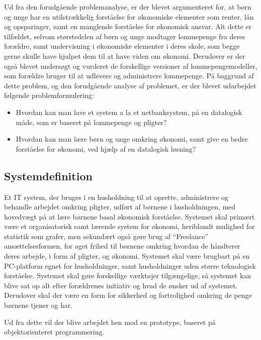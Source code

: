 Ud fra den forudgående problemanalyse, er der blevet argumenteret for, at børn og unge har en utilstrækkelig forståelse for økonomiske elementer som renter, lån og opsparinger, samt en manglende forståelse for økonomisk ansvar. Alt dette er tilfældet, selvom størstedelen af børn og unge modtager lommepenge fra deres forældre, samt undervisning i økonomiske elementer i deres skole, som begge gerne skulle have hjulpet dem til at have viden om økonomi. Derudover er der også blevet undersøgt og vurderet de forskellige versioner af lommepengemodeller, som forældre bruger til at udlevere og administrere lommepenge. På baggrund af dette problem, og den forudgående analyse af problemet, er der blevet udarbejdet følgende problemformulering:

\begin{itemize}

	\item Hvordan kan man lave et system a la et netbanksystem, på en datalogisk måde, som er baseret på lommepenge og pligter?
	\item Hvordan kan man lære børn og unge omkring økonomi, samt give en bedre forståelse for økonomi, ved hjælp af en datalogisk løsning?

\end{itemize}

\subsection{Systemdefinition}
Et IT system, der bruges i en husholdning til at oprette, administrere og behandle arbejdet omkring pligter, udført af børnene i husholdningen, med hovedvægt på at lære børnene basal økonomisk forståelse. Systemet skal primært være et organisatorisk samt lærende system for økonomi, heriblandt mulighed for statistik som grafer, men sekundært også gøre brug af “Freelance” ansættelsesformen, for øget frihed til børnene omkring hvordan de håndterer deres arbejde, i form af pligter, og økonomi. Systemet skal være brugbart på en PC-platform egnet for husholdninger, samt husholdninger uden større teknologisk forståelse. Systemet  skal gøre forskellige værktøjer tilgængelige, så systemet kan blive sat op alt efter forældrenes initiativ og hvad de ønsker ud af systemet. Derudover skal der være en form for sikkerhed og fortrolighed omkring de penge børnene tjener og har.

Ud fra dette vil der blive arbejdet hen mod en prototype, baseret på objektorienteret programmering.